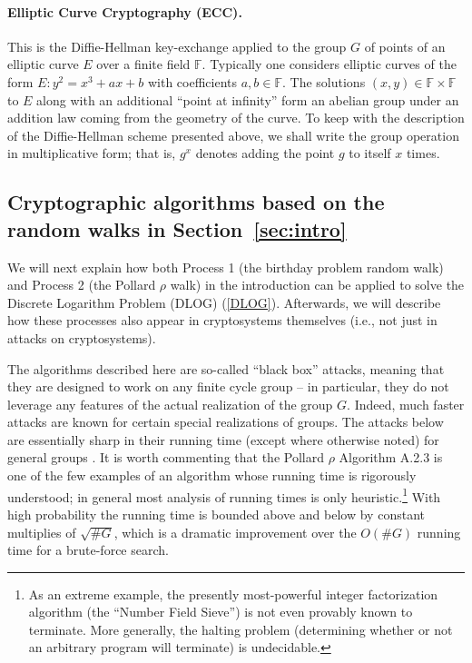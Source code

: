 \documentclass{llncs}
\numberwithin{equation}{section}
\newcommand\F{{\mathbb F}}
\renewcommand\({\left(}
\renewcommand\){\right)}
\begin{document}
\paragraph{\bf Elliptic Curve Cryptography (ECC).}  This is the Diffie-Hellman key-exchange applied to the group $G$ of points of an elliptic curve $E$ over a finite field $\mathbb{F}$.  Typically one considers elliptic curves of the form $E:y^2=x^3+ax+b$ with coefficients $a,b\in \F$.  The solutions
$(x,y)\in \F\times \F$ to $E$ along with an additional ``point at infinity''   form an abelian group    under an addition law coming from the geometry of the curve.  To keep with the description of the Diffie-Hellman scheme presented above, we shall write the group operation in multiplicative form; that is, $g^x$ denotes adding the point $g$ to itself $x$ times.



\subsection{Cryptographic algorithms based on the random walks in Section~\ref{sec:intro}}\label{sec:sub:dlog}


We will next explain how both
  Process 1  (the birthday problem random walk) and Process 2 (the Pollard $\rho$ walk) in the introduction can be applied to solve the Discrete Logarithm Problem (DLOG) (\ref{DLOG}).  Afterwards, we will describe how these processes also appear in cryptosystems themselves (i.e., not just in attacks on cryptosystems).


   The algorithms described here are so-called ``black box'' attacks,
meaning that they are designed to work on any finite cycle group -- in particular, they do not leverage any features of the actual realization of the group $G$.   Indeed, much faster attacks are known for certain special realizations of groups.  The attacks below are essentially sharp in their running time (except where otherwise noted) for general groups \cite{KMPT,MV2,shoup}.  It is worth commenting that the Pollard $\rho$ Algorithm A.2.3 is one of the few examples of an algorithm whose running time is rigorously understood; in general most analysis of running times is only heuristic.\footnote{
As an extreme example, the presently most-powerful integer factorization algorithm (the ``Number Field Sieve'') is not even provably known to  terminate.  More generally, the halting problem (determining whether or not an arbitrary program will terminate) is undecidable.}  With high probability the running time is bounded above and below by constant multiplies of $\sqrt{\# G}$, which is a dramatic improvement over the   $O(\#G)$ running time for a brute-force search.
\end{document}
